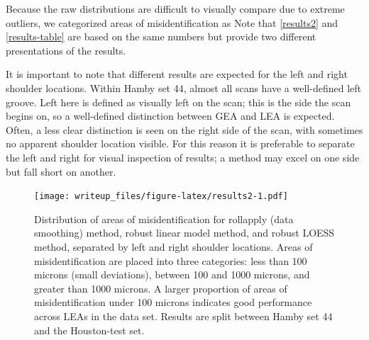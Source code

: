 \documentclass[12pt]{article}
\begin{document}
Because the raw distributions are difficult to visually compare due to
extreme outliers, we categorized areas of misidentification as
{}
Note that \autoref{results2} and \autoref{results-table} are based on
the same numbers but provide two different presentations of the results.

It is important to note that different results are expected for the left
and right shoulder locations. Within Hamby set 44, almost all scans have
a well-defined left groove. Left here is defined as visually left on the
scan; this is the side the scan begins on, so a well-defined distinction
between GEA and LEA is expected. Often, a less clear distinction is seen
on the right side of the scan, with sometimes no apparent shoulder
location visible.
{\color{teal}{This may be due to the left shoulder corresponding to the leading edge in the twist of a bullet as it is propelled through a gun barrel.}}
For this reason it is preferable to separate the left and right for
visual inspection of results; a method may excel on one side but fall
short on another.

\begin{figure}
\centering
\texttt{[image: writeup\_files/figure-latex/results2-1.pdf]}
\caption{\label{results2}Distribution of areas of misidentification for
rollapply (data smoothing) method, robust linear model method, and
robust LOESS method, separated by left and right shoulder locations.
Areas of misidentification are placed into three categories: less than
100 microns (small deviations), between 100 and 1000 microns, and
greater than 1000 microns. A larger proportion of areas of
misidentification under 100 microns indicates good performance across
LEAs in the data set. Results are split between Hamby set 44 and the
Houston-test set.}
\end{figure}
\end{document}
